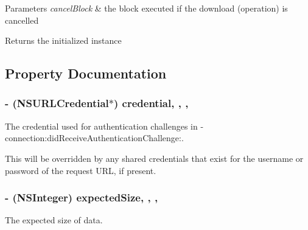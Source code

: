 \begin{DoxyParams}{Parameters}
{\em cancel\+Block} & the block executed if the download (operation) is cancelled\\
\hline
\end{DoxyParams}
\begin{DoxyReturn}{Returns}
the initialized instance 
\end{DoxyReturn}


\subsection{Property Documentation}
\hypertarget{interface_s_d_web_image_downloader_operation_aeecac5b9b93001026f4e90f2804c8cca}{}
\subsubsection[{credential}]{\setlength{\rightskip}{0pt plus 5cm}-\/ (N\+S\+U\+R\+L\+Credential$\ast$) credential\hspace{0.3cm}{\ttfamily [read]}, {\ttfamily [write]}, {\ttfamily [nonatomic]}, {\ttfamily [strong]}}\label{interface_s_d_web_image_downloader_operation_aeecac5b9b93001026f4e90f2804c8cca}
The credential used for authentication challenges in {\ttfamily -\/connection\+:did\+Receive\+Authentication\+Challenge\+:}.

This will be overridden by any shared credentials that exist for the username or password of the request U\+R\+L, if present. \hypertarget{interface_s_d_web_image_downloader_operation_ace822ba63156e817ce6f6671c7c67880}{}
\subsubsection[{expected\+Size}]{\setlength{\rightskip}{0pt plus 5cm}-\/ (N\+S\+Integer) expected\+Size\hspace{0.3cm}{\ttfamily [read]}, {\ttfamily [write]}, {\ttfamily [nonatomic]}, {\ttfamily [assign]}}\label{interface_s_d_web_image_downloader_operation_ace822ba63156e817ce6f6671c7c67880}
The expected size of data. \hypertarget{interface_s_d_web_image_downloader_operation_a4f2ad3e089bd8130321fa8cceccaafee}{}
